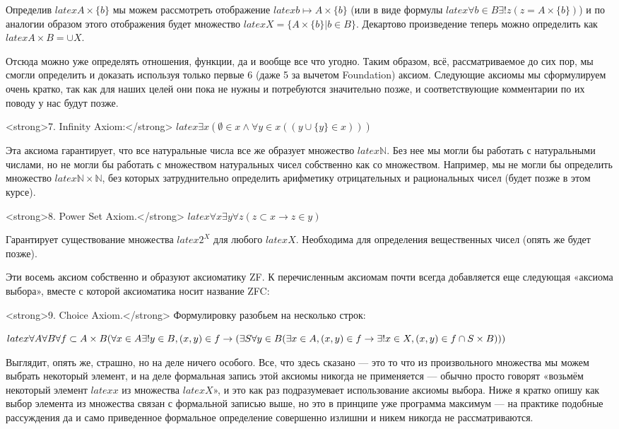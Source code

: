 Определив $latex A\times\{b\}$ мы можем рассмотреть отображение $latex b\mapsto A \times \{b\}$ (или в виде формулы $latex \forall b\in B \exists! z (z = A\times\{b\})$) и по аналогии образом этого отображения будет множество $latex X = \{A\times \{ b \} | b \in B\}$. Декартово произведение теперь можно определить как $latex A\times B = \cup X$.

Отсюда можно уже определять отношения, функции, да и вообще все что угодно. Таким образом, всё, рассматриваемое до сих пор, мы смогли определить и доказать используя только первые 6 (даже 5 за вычетом Foundation) аксиом. Следующие аксиомы мы сформулируем очень кратко, так как для наших целей они пока не нужны и потребуются значительно позже, и соответствующие комментарии по их поводу у нас будут позже.

<strong>7. Infinity Axiom:</strong> $latex \exists x (\emptyset \in x \wedge \forall y \in x ((y\cup\{y\}\in x)))$

Эта аксиома гарантирует, что все натуральные числа все же образует множество $latex \mathbb{N}$. Без нее мы могли бы работать с натуральными числами, но не могли бы работать с множеством натуральных чисел собственно как со множеством. Например, мы не могли бы определить множество $latex \mathbb{N}\times\mathbb{N}$, без которых затруднительно определить арифметику отрицательных и рациональных чисел (будет позже в этом курсе).

<strong>8. Power Set Axiom.</strong> $latex \forall x \exists y \forall z (z\subset x \rightarrow z\in y)$

Гарантирует существование множества $latex 2^X$ для любого $latex X$. Необходима для определения вещественных чисел (опять же будет позже).

Эти восемь аксиом собственно и образуют аксиоматику ZF. К перечисленным аксиомам почти всегда добавляется еще следующая «аксиома выбора», вместе с которой аксиоматика носит название ZFC:

<strong>9. Choice Axiom.</strong> Формулировку разобьем на несколько строк:

$latex \forall A \forall B \forall f\subset A\times B \\(\forall x \in A \exists! y\in B, (x, y)\in f\rightarrow\\ (\exists S\forall y\in B(\exists x\in A, (x, y)\in f \rightarrow \\ \exists!x\in X, (x, y)\in f\cap S\times B)))$

Выглядит, опять же, страшно, но на деле ничего особого. Все, что здесь сказано — это то что из произвольного множества мы можем выбрать некоторый элемент, и на деле формальная запись этой аксиомы никогда не применяется — обычно просто говорят «возьмём некоторый элемент $latex x$ из множества $latex X$», и это как раз подразумевает использование аксиомы выбора. Ниже я кратко опишу как выбор элемента из множества связан с формальной записью выше, но это в принципе уже программа максимум — на практике подобные рассуждения да и само приведенное формальное определение совершенно излишни и никем никогда не рассматриваются.

